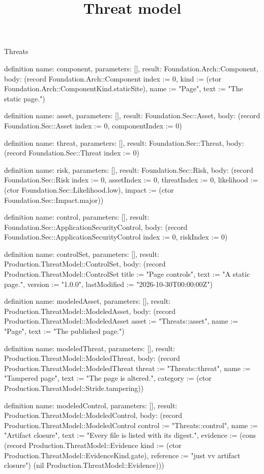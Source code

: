 \begin{lexlean}{Threats}
\title{Threat model}
\begin{semanticmodule}
definition{
  name: component,
  parameters: [],
  result: Foundation.Arch::Component,
  body: (record Foundation.Arch::Component {index := 0, kind := (ctor Foundation.Arch::ComponentKind.staticSite), name := "Page", text := "The static page."})
}

definition{
  name: asset,
  parameters: [],
  result: Foundation.Sec::Asset,
  body: (record Foundation.Sec::Asset {index := 0, componentIndex := 0})
}

definition{
  name: threat,
  parameters: [],
  result: Foundation.Sec::Threat,
  body: (record Foundation.Sec::Threat {index := 0})
}

definition{
  name: risk,
  parameters: [],
  result: Foundation.Sec::Risk,
  body: (record Foundation.Sec::Risk {index := 0, assetIndex := 0, threatIndex := 0, likelihood := (ctor Foundation.Sec::Likelihood.low), impact := (ctor Foundation.Sec::Impact.major)})
}

definition{
  name: control,
  parameters: [],
  result: Foundation.Sec::ApplicationSecurityControl,
  body: (record Foundation.Sec::ApplicationSecurityControl {index := 0, riskIndex := 0})
}

definition{
  name: controlSet,
  parameters: [],
  result: Production.ThreatModel::ControlSet,
  body: (record Production.ThreatModel::ControlSet {title := "Page controls", text := "A static page.", version := "1.0.0", lastModified := "2026-10-30T00:00:00Z"})
}

definition{
  name: modeledAsset,
  parameters: [],
  result: Production.ThreatModel::ModeledAsset,
  body: (record Production.ThreatModel::ModeledAsset {asset := "Threats::asset", name := "Page", text := "The published page."})
}

definition{
  name: modeledThreat,
  parameters: [],
  result: Production.ThreatModel::ModeledThreat,
  body: (record Production.ThreatModel::ModeledThreat {threat := "Threats::threat", name := "Tampered page", text := "The page is altered.", category := (ctor Production.ThreatModel::Stride.tampering)})
}

definition{
  name: modeledControl,
  parameters: [],
  result: Production.ThreatModel::ModeledControl,
  body: (record Production.ThreatModel::ModeledControl {control := "Threats::control", name := "Artifact closure", text := "Every file is listed with its digest.", evidence := (cons (record Production.ThreatModel::Evidence {kind := (ctor Production.ThreatModel::EvidenceKind.gate), reference := "just vv artifact closure"}) (nil Production.ThreatModel::Evidence))})
}
\end{semanticmodule}
\end{lexlean}
